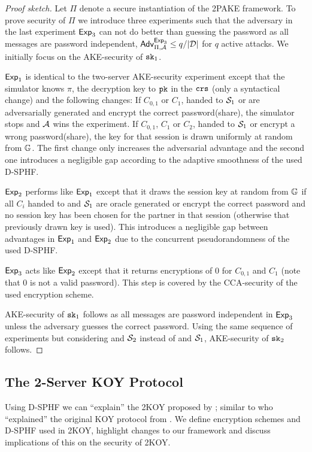 \begin{proof}[Proof sketch]
Let $\Pi$ denote a secure instantiation of the \ac{2PAKE} framework.
To prove security of $\Pi$ we introduce three experiments such that the adversary in the last experiment $\mathsf{Exp}_3$ can not do better than guessing the password as all messages are password independent, \ie $\mathsf{Adv}_{\Pi,\mathcal{A}}^{\mathsf{Exp}_3}\leq q/|\mathcal{D}|$ for $q$ active attacks.
We initially focus on the \ac{AKE}-security of $\mathtt{sk}_1$.

$\mathsf{Exp}_1$ is identical to the two-server \ac{AKE}-security experiment except that the simulator knows $\pi$, the decryption key to $\mathtt{pk}$ in the $\mathtt{crs}$ (only a syntactical change) and the following changes:
If $C_{0,1}$ or $C_{1}$, handed to $\mathcal{S}_1$ or \Client are adversarially generated and encrypt the correct password(share), the simulator stops and $\mathcal{A}$ wins the experiment.
If $C_{0,1}$, $C_1$ or $C_2$, handed to $\mathcal{S}_1$ or \Client encrypt a wrong password(share), the key for that session is drawn uniformly at random from $\mathbb{G}$.
The first change only increases the adversarial advantage and the second one introduces a negligible gap according to the adaptive smoothness of the used \ac{D-SPHF}.

$\mathsf{Exp}_2$ performs like $\mathsf{Exp}_1$ except that it draws the session key at random from $\mathbb{G}$ if all $C_i$ handed to \Client and $\mathcal{S}_1$ are oracle generated or encrypt the correct password and no session key has been chosen for the partner in that session (otherwise that previously drawn key is used).
This introduces a negligible gap between advantages in $\mathsf{Exp}_1$ and $\mathsf{Exp}_2$ due to the concurrent pseudorandomness of the used \ac{D-SPHF}.

$\mathsf{Exp}_3$ acts like $\mathsf{Exp}_2$ except that it returns encryptions of $0$ for $C_{0,1}$ and $C_1$ (note that $0$ is not a valid password).
This step is covered by the \ac{CCA}-security of the used encryption scheme.

\ac{AKE}-security of $\mathtt{sk}_1$ follows as all messages are password independent in $\mathsf{Exp}_3$ unless the adversary guesses the correct password.
Using the same sequence of experiments but considering \Client and $\mathcal{S}_2$ instead of \Client and $\mathcal{S}_1$, \ac{AKE}-security of $\mathtt{sk}_2$ follows.
\end{proof}

\subsection{The 2-Server KOY Protocol}\label{sec:twokoy}
Using \ac{D-SPHF} we can ``explain'' the 2KOY proposed by \citet{Katz2012a}; similar to \citet{Gennaro2003} who ``explained'' the original KOY protocol from \citet{KatzOY01}.
We define encryption schemes and \ac{D-SPHF} used in 2KOY, highlight changes to our framework and discuss implications of this on the security of 2KOY.

